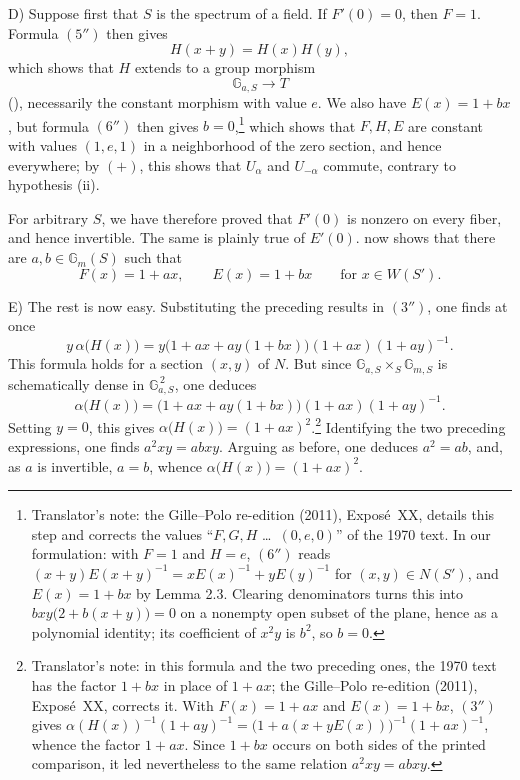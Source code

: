 
\textup{D)} Suppose first that \(S\) is the spectrum of a field.
If \(F'(0)=0\), then \(F=1\). Formula \((5'')\) then gives
\[
  H(x+y)=H(x)H(y),
\]
which shows that \(H\) extends to a group morphism
\[
  \mathbb G_{a,S}\longrightarrow T
\]
\textup{()}, necessarily the constant morphism
with value \(e\). We also have \(E(x)=1+bx\), but formula \((6'')\)
then gives \(b=0\),\footnote{Translator's note: the Gille--Polo re-edition (2011), Exposé~XX, details this step and corrects the values
``\(F,G,H\) \ldots\ \((0,e,0)\)'' of the 1970 text. In our formulation: with \(F=1\) and \(H=e\),
\((6'')\) reads \((x+y)E(x+y)^{-1}=xE(x)^{-1}+yE(y)^{-1}\) for \((x,y)\in N(S')\), and
\(E(x)=1+bx\) by Lemma 2.3. Clearing denominators turns this into
\(bxy\bigl(2+b(x+y)\bigr)=0\) on a nonempty open subset of the plane, hence as a polynomial
identity; its coefficient of \(x^2y\) is \(b^2\), so \(b=0\).} which shows that \(F,H,E\) are constant with
values \((1,e,1)\) in a neighborhood of the zero section, and hence
everywhere; by \((+)\), this shows that \(U_\alpha\) and
\(U_{-\alpha}\) commute, contrary to hypothesis \textup{(ii)}.

For arbitrary \(S\), we have therefore proved that \(F'(0)\) is
nonzero on every fiber, and hence invertible. The same is plainly
true of \(E'(0)\).  now shows that there are
\(a,b\in\mathbb G_m(S)\) such that
\[
  F(x)=1+ax,\qquad E(x)=1+bx
  \qquad\text{for }x\in W(S').
\]

\textup{E)} The rest is now easy. Substituting the preceding
results in \((3'')\), one finds at once
\[
  y\,\alpha\bigl(H(x)\bigr)
   =y\bigl(1+ax+ay(1+bx)\bigr)(1+ax)(1+ay)^{-1}.
\]
This formula holds for a section \((x,y)\) of \(N\). But since
\(\mathbb G_{a,S}\times_S\mathbb G_{m,S}\) is schematically dense
in \(\mathbb G_{a,S}^{\,2}\), one deduces
\[
  \alpha\bigl(H(x)\bigr)
   =\bigl(1+ax+ay(1+bx)\bigr)(1+ax)(1+ay)^{-1}.
\]
Setting \(y=0\), this gives \(\alpha\bigl(H(x)\bigr)=(1+ax)^2\).\footnote{Translator's note:
in this formula and the two preceding ones, the 1970 text has the factor \(1+bx\) in place of
\(1+ax\); the Gille--Polo re-edition (2011), Exposé~XX, corrects it. With \(F(x)=1+ax\) and
\(E(x)=1+bx\), \((3'')\) gives \(\alpha(H(x))^{-1}(1+ay)^{-1}
=\bigl(1+a(x+yE(x))\bigr)^{-1}(1+ax)^{-1}\), whence the factor \(1+ax\). Since \(1+bx\) occurs on
both sides of the printed comparison, it led nevertheless to the same relation \(a^2xy=abxy\).}
Identifying the two preceding expressions, one finds
\(a^2xy=abxy\). Arguing as before, one deduces \(a^2=ab\), and, as
\(a\) is invertible, \(a=b\), whence
\(\alpha\bigl(H(x)\bigr)=(1+ax)^2\).

